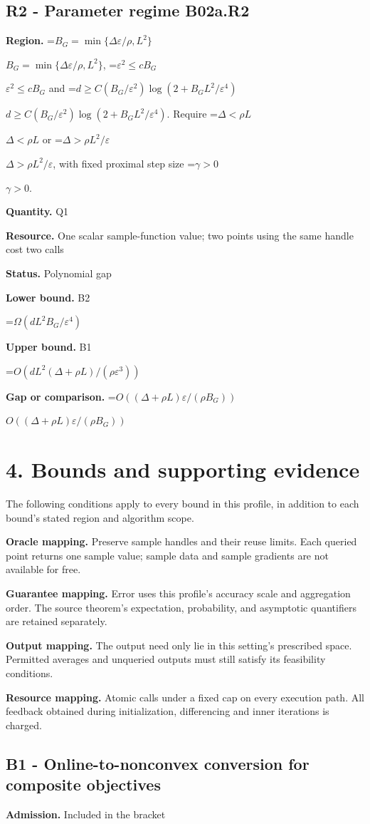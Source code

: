 \documentclass[10pt,a4paper]{article}
\newcommand{\AtlasMath}[1]{\par\begingroup\centering\setbox0=\hbox{$\displaystyle #1$}\ifdim\wd0>1.4\linewidth\typeout{ATLAS WIDE FORMULA: \the\wd0}\fi\ifdim\wd0>\linewidth\resizebox{\linewidth}{!}{\box0}\else\box0\fi\par\endgroup}
\newcommand{\AtlasInlineMath}[1]{\begingroup\setbox0=\hbox{$#1$}\ifdim\wd0>.4\linewidth\endgroup\AtlasMath{#1}\else\endgroup$#1$\fi}
\begin{document}
\subsection{R2 - Parameter regime B02a.R2}
\textbf{Region.} \AtlasInlineMath{B_G=\min\{\Delta\varepsilon/\rho,L^2\}}, \AtlasInlineMath{\varepsilon^2\le cB_G} and \AtlasInlineMath{d\ge C(B_G/\varepsilon^2)\log(2+B_GL^2/\varepsilon^4)}. Require \AtlasInlineMath{\Delta<\rho L} or \AtlasInlineMath{\Delta>\rho L^2/\varepsilon}, with fixed proximal step size \AtlasInlineMath{\gamma>0}.

\textbf{Quantity.} Q1

\textbf{Resource.} One scalar sample-function value; two points using the same handle cost two calls

\textbf{Status.} Polynomial gap

\textbf{Lower bound.} B2

\AtlasMath{\Omega(dL^2B_G/\varepsilon^4)}
\textbf{Upper bound.} B1

\AtlasMath{O(dL^2(\Delta+\rho L)/(\rho\varepsilon^3))}
\textbf{Gap or comparison.} \AtlasInlineMath{O((\Delta+\rho L)\varepsilon/(\rho B_G))}

\section{4. Bounds and supporting evidence}
The following conditions apply to every bound in this profile, in addition to each bound's stated region and algorithm scope.

\textbf{Oracle mapping.} Preserve sample handles and their reuse limits. Each queried point returns one sample value; sample data and sample gradients are not available for free.

\textbf{Guarantee mapping.} Error uses this profile's accuracy scale and aggregation order. The source theorem's expectation, probability, and asymptotic quantifiers are retained separately.

\textbf{Output mapping.} The output need only lie in this setting's prescribed space. Permitted averages and unqueried outputs must still satisfy its feasibility conditions.

\textbf{Resource mapping.} Atomic calls under a fixed cap on every execution path. All feedback obtained during initialization, differencing and inner iterations is charged.

\subsection{B1 - Online-to-nonconvex conversion for composite objectives}
\textbf{Admission.} Included in the bracket
\end{document}

